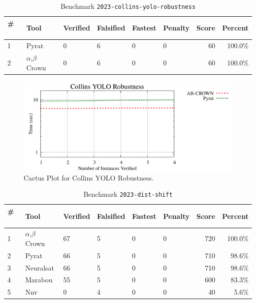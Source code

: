 
\begin{table}[h]
\begin{center}
\caption{Benchmark \texttt{2023-collins-yolo-robustness}} \label{tab:cat_{cat}}
{\setlength{\tabcolsep}{2pt}
\begin{tabular}[h]{@{}llllllrr@{}}
\toprule
\textbf{\# ~} & \textbf{Tool} & \textbf{Verified} & \textbf{Falsified} & \textbf{Fastest} & \textbf{Penalty} & \textbf{Score} & \textbf{Percent}\\
\midrule
1 & Pyrat & 0 & 6 & 0 & 0 & 60 & 100.0\% \\
2 & $\alpha$,$\beta$ Crown & 0 & 6 & 0 & 0 & 60 & 100.0\% \\
\bottomrule
\end{tabular}
}
\end{center}
\end{table}



\begin{figure}[h]
\centerline{\includegraphics[width=\textwidth]{cactus/2023_collins_yolo_robustness.pdf}}
\caption{Cactus Plot for Collins YOLO Robustness.}
\label{fig:quantPic}
\end{figure}



\begin{table}[h]
\begin{center}
\caption{Benchmark \texttt{2023-dist-shift}} \label{tab:cat_{cat}}
{\setlength{\tabcolsep}{2pt}
\begin{tabular}[h]{@{}llllllrr@{}}
\toprule
\textbf{\# ~} & \textbf{Tool} & \textbf{Verified} & \textbf{Falsified} & \textbf{Fastest} & \textbf{Penalty} & \textbf{Score} & \textbf{Percent}\\
\midrule
1 & $\alpha$,$\beta$ Crown & 67 & 5 & 0 & 0 & 720 & 100.0\% \\
2 & Pyrat & 66 & 5 & 0 & 0 & 710 & 98.6\% \\
3 & Neuralsat & 66 & 5 & 0 & 0 & 710 & 98.6\% \\
4 & Marabou & 55 & 5 & 0 & 0 & 600 & 83.3\% \\
5 & Nnv & 0 & 4 & 0 & 0 & 40 & 5.6\% \\
\bottomrule
\end{tabular}
}
\end{center}
\end{table}



